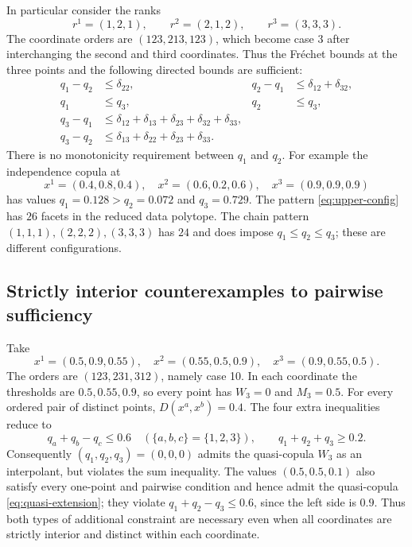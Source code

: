 \documentclass[a4paper,11pt]{amsart}
\numberwithin{equation}{section}
\theoremstyle{definition}
\theoremstyle{remark}
\begin{document}
In particular consider the ranks
\begin{equation}
 r^1=(1,2,1),\qquad r^2=(2,1,2),\qquad r^3=(3,3,3).
 \label{eq:upper-config}
\end{equation}
The coordinate orders are $(123,213,123)$, which become case 3 after
interchanging the second and third coordinates. Thus the Fr\'echet bounds
at the three points and the following directed bounds are sufficient:
\begin{align*}
 q_1-q_2&\leq\delta_{22},&
 q_2-q_1&\leq\delta_{12}+\delta_{32},\\
 q_1&\leq q_3,&q_2&\leq q_3,\\
 q_3-q_1&\leq\delta_{12}+\delta_{13}+\delta_{23}+\delta_{32}+\delta_{33},\\
 q_3-q_2&\leq\delta_{13}+\delta_{22}+\delta_{23}+\delta_{33}.
\end{align*}
There is no monotonicity requirement between $q_1$ and $q_2$.
For example the independence copula at
\[
 x^1=(0.4,0.8,0.4),\quad x^2=(0.6,0.2,0.6),\quad
 x^3=(0.9,0.9,0.9)
\]
has values $q_1=0.128>q_2=0.072$ and $q_3=0.729$.
The pattern \eqref{eq:upper-config} has $26$ facets in the reduced data
polytope. The chain pattern $(1,1,1),(2,2,2),(3,3,3)$ has $24$ and does
impose $q_1\leq q_2\leq q_3$; these are different configurations.

\subsection{Strictly interior counterexamples to pairwise sufficiency}
Take
\begin{equation}
 x^1=(0.5,0.9,0.55),\quad
 x^2=(0.55,0.5,0.9),\quad
 x^3=(0.9,0.55,0.5).\label{eq:strict-example}
\end{equation}
The orders are $(123,231,312)$, namely case 10. In each coordinate the
thresholds are $0.5,0.55,0.9$, so every point has $W_3=0$ and $M_3=0.5$.
For every ordered pair of distinct points, $D(x^a,x^b)=0.4$.
The four extra inequalities reduce to
\begin{equation}
 q_a+q_b-q_c\leq0.6\quad(\{a,b,c\}=\{1,2,3\}),
 \qquad q_1+q_2+q_3\geq0.2.\label{eq:strict-extra}
\end{equation}
Consequently $(q_1,q_2,q_3)=(0,0,0)$ admits the quasi-copula $W_3$ as an
interpolant, but violates the sum inequality. The values $(0.5,0.5,0.1)$
also satisfy every one-point and pairwise condition and hence admit the
quasi-copula \eqref{eq:quasi-extension}; they violate
$q_1+q_2-q_3\leq0.6$, since the left side is $0.9$.
Thus both types of additional constraint are necessary even when all
coordinates are strictly interior and distinct within each coordinate.
\end{document}
